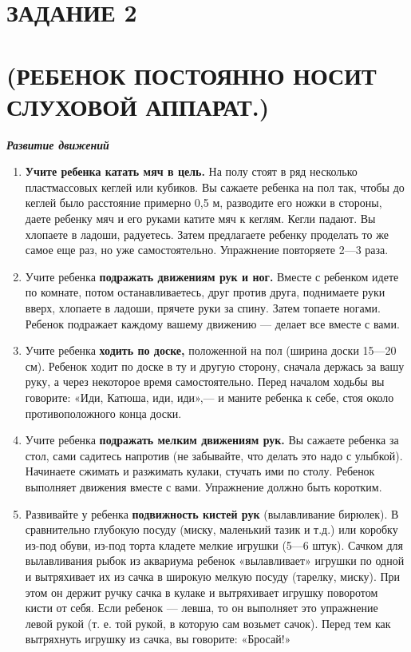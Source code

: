 \documentclass{book}
\renewcommand{\emph}[1]{\textit{#1}}
\begin{document}
\section{ЗАДАНИЕ 2}\section*{(РЕБЕНОК ПОСТОЯННО НОСИТ СЛУХОВОЙ АППАРАТ.)}

\emph{\textbf{Развитие движений}}

\begin{enumerate}
\def\labelenumi{\arabic{enumi}.}
\item \textbf{Учите ребенка катать мяч в цель.} На полу стоят в ряд
несколько пластмассовых кеглей или кубиков. Вы сажаете ребенка на пол
так, чтобы до кеглей было расстояние примерно 0,5 м, разводите его ножки
в стороны, даете ребенку мяч и его руками катите мяч к кеглям. Кегли
падают. Вы хлопаете в ладоши, радуетесь. Затем предлагаете ребенку
проделать то же самое еще раз, но уже самостоятельно. Упражнение
повторяете 2---3 раза.

\item
  
  Учите ребенка \textbf{подражать движениям рук и ног.} Вместе с
  ребенком идете по комнате, потом останавливаетесь, друг против друга,
  поднимаете руки вверх, хлопаете в ладоши, прячете руки за спину. Затем
  топаете ногами. Ребенок подражает каждому вашему движению --- делает
  все вместе с вами.
  
\item
  
  Учите ребенка \textbf{ходить по доске,} положенной на пол (ширина
  доски 15---20 см). Ребенок ходит по доске в ту и другую сторону,
  сначала держась за вашу руку, а через некоторое время самостоятельно.
  Перед началом ходьбы вы говорите: «Иди, Катюша, иди, иди»,--- и маните
  ребенка к себе, стоя около противоположного конца доски.
  
\item
  
  Учите ребенка \textbf{подражать мелким движениям рук.} Вы сажаете
  ребенка за стол, сами садитесь напротив (не забывайте, что делать это
  надо с улыбкой). Начинаете сжимать и разжимать кулаки, стучать ими по
  столу. Ребенок выполняет движения вместе с вами. Упражнение должно
  быть коротким.
  
\item
  
  Развивайте у ребенка \textbf{подвижность кистей рук} (вылавливание
  бирюлек). В сравнительно глубокую посуду (миску, маленький тазик и
  т.д.) или коробку из-под обуви, из-под торта кладете мелкие игрушки
  (5---6 штук). Сачком для вылавливания рыбок из аквариума ребенок
  «вылавливает» игрушки по одной и вытряхивает их из сачка в широкую
  мелкую посуду (тарелку, миску). При этом он держит ручку сачка в
  кулаке и вытряхивает игрушку поворотом кисти от себя. Если ребенок ---
  левша, то он выполняет это упражнение левой рукой (т. е. той рукой, в
  которую сам возьмет сачок). Перед тем как вытряхнуть игрушку из сачка,
  вы говорите: «Бросай!»
  
\end{enumerate}
\end{document}
